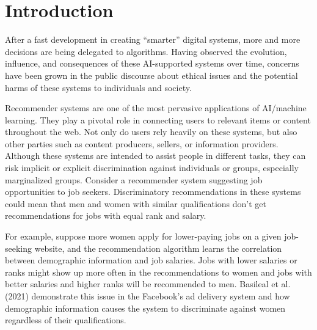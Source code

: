 \chapter{Introduction}
\label{ch:intro}



After a fast development in creating ``smarter'' digital systems, more and more decisions are being delegated to algorithms. Having observed the evolution, influence, and consequences of these AI-supported systems over time, concerns have been grown in the public discourse about ethical issues and the potential harms of these systems to individuals and society. 
 
Recommender systems are one of the most pervasive applications of AI/machine learning. They play a pivotal role in connecting users to relevant items or content throughout the web. Not only do users rely heavily on these systems, but also other parties such as content producers, sellers, or information providers. Although these systems are intended to assist people in different tasks, they can risk implicit or explicit discrimination against individuals or groups, especially marginalized groups. Consider a recommender system suggesting job opportunities to job seekers. Discriminatory recommendations in these systems could mean that men and women with similar qualifications don't get recommendations for jobs with equal rank and salary.



For example, suppose more women apply for lower-paying jobs on a given job-seeking website, and the recommendation algorithm learns the correlation between demographic information and job salaries. Jobs with lower salaries or ranks might show up more often in the recommendations to women and jobs with better salaries and higher ranks will be recommended to men. Basileal et al. (2021) \cite{Korolova2021JobAds} demonstrate this issue in the Facebook's ad delivery system and how demographic information causes the system to discriminate against women regardless of their qualifications.

